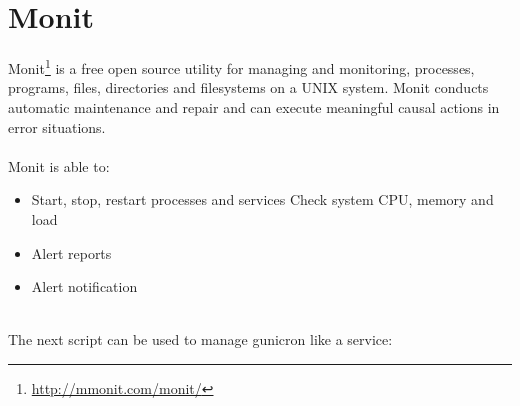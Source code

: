 \documentclass[a4paper,11pt]{article}
\begin{document}
\section{Monit}
Monit\footnote{\url{http://mmonit.com/monit/}} is a free open source utility for managing and monitoring, processes, programs, files, directories and filesystems on a UNIX system. Monit conducts automatic maintenance and repair and can execute meaningful causal actions in error situations.
\\
\\
Monit is able to:
\begin{itemize}
\item Start, stop, restart processes and services
\tiem Check system CPU, memory and load
\item Alert reports
\item Alert notification
\end{itemize}
\\
The next script can be used to manage gunicron like a service:
\end{document}
